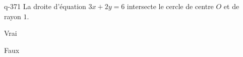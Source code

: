 \begin{truefalse}{q-371}
La droite d'équation $3x+2y=6$ intersecte le cercle de centre $O$ et de rayon $1$.
\item Vrai
\item* Faux
\end{truefalse}

